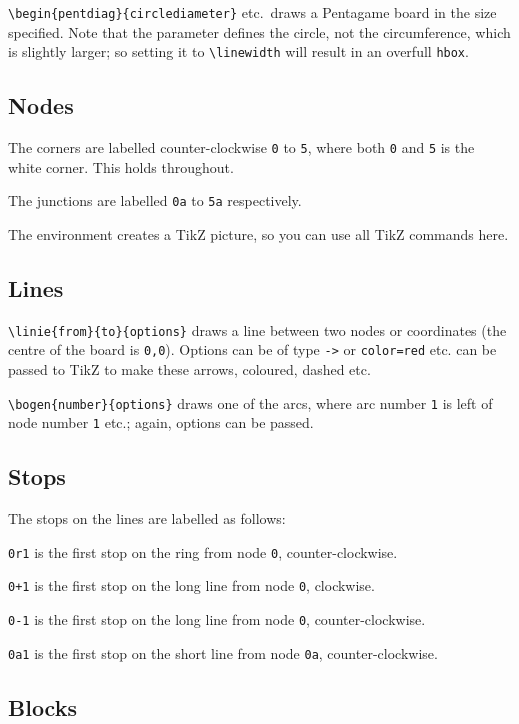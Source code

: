 \documentclass[a5paper]{scrartcl}
\begin{document}
\verb|\begin{pentdiag}{circlediameter}| etc.~draws a Pentagame board in the size specified. Note that the parameter defines the circle, not the circumference, which is slightly larger; so setting it to \verb|\linewidth| will result in an overfull \verb|hbox|.

\subsection*{Nodes}

The corners are labelled counter-clockwise \verb|0| to \verb|5|, where both \verb|0| and \verb|5| is the white corner. This holds throughout. 

The junctions are labelled \verb|0a| to \verb|5a| respectively.

The environment creates a TikZ picture, so you can use all TikZ commands here. 

\subsection*{Lines}

\verb|\linie{from}{to}{options}| draws a line between two nodes or coordinates (the centre of the board is \verb|0,0|). Options can be of type \verb|->| or \verb|color=red| etc. can be passed to TikZ to make these arrows, coloured, dashed etc. 

\noindent\verb|\bogen{number}{options}| draws one of the arcs, where arc number \verb|1| is left of node number \verb|1| etc.; again, options can be passed. 

\subsection*{Stops}

The stops on the lines are labelled as follows:

    \verb|0r1| is the first stop on the ring from node \verb|0|, counter-clockwise.
    
    \verb|0+1| is the first stop on the long line from node \verb|0|, clockwise.
    
    \verb|0-1| is the first stop on the long line from node \verb|0|, counter-clockwise.
    
    \verb|0a1| is the first stop on the short line from node \verb|0a|, counter-clockwise.

\subsection*{Blocks}
\end{document}

